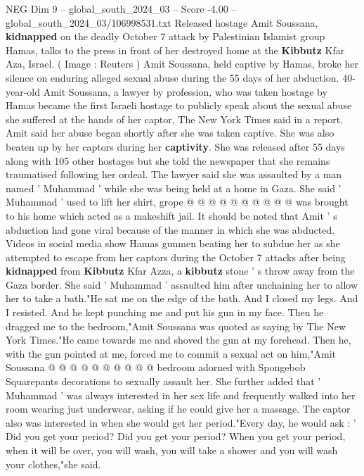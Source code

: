 \begin{textsample}{NEG Dim 9 – global\_south\_2024\_03 – Score -4.00 – global\_south\_2024\_03/106998531.txt}  \label{ex:f9_neg_372}
Released hostage Amit Soussana, \textbf{kidnapped} on the deadly October 7 attack by Palestinian Islamist group Hamas, talks to the press in front of her destroyed home at the \textbf{Kibbutz} Kfar Aza, Israel. ( Image : Reuters ) Amit Soussana, held captive by Hamas, broke her silence on enduring alleged sexual abuse during the 55 days of her abduction. 40-year-old Amit Soussana, a lawyer by profession, who was taken hostage by Hamas became the first Israeli hostage to publicly speak about the sexual abuse she suffered at the hands of her captor, The New York Times said in a report.
Amit said her abuse began shortly after she was taken captive.
She was also beaten up by her captors during her \textbf{captivity}.
She was released after 55 days along with 105 other hostages but she told the newspaper that she remains traumatised following her ordeal.
The lawyer said she was assaulted by a man named ' Muhammad ' while she was being held at a home in Gaza.
She said ' Muhammad ' used to lift her shirt, grope @ @ @ @ @ @ @ @ @ @ was brought to his home which acted as a makeshift jail.
It should be noted that Amit ' s abduction had gone viral because of the manner in which she was abducted.
Videos in social media show Hamas gunmen beating her to subdue her as she attempted to escape from her captors during the October 7 attacks after being \textbf{kidnapped} from \textbf{Kibbutz} Kfar Azza, a \textbf{kibbutz} stone ' s throw away from the Gaza border.
She said ' Muhammad ' assaulted him after unchaining her to allow her to take a bath."He sat me on the edge of the bath.
And I closed my legs.
And I resisted.
And he kept punching me and put his gun in my face.
Then he dragged me to the bedroom,"Amit Soussana was quoted as saying by The New York Times."He came towards me and shoved the gun at my forehead.
Then he, with the gun pointed at me, forced me to commit a sexual act on him,"Amit Soussana @ @ @ @ @ @ @ @ @ @ bedroom adorned with Spongebob Squarepants decorations to sexually assault her.
She further added that ' Muhammad ' was always interested in her sex life and frequently walked into her room wearing just underwear, asking if he could give her a massage.
The captor also was interested in when she would get her period."Every day, he would ask : ' Did you get your period?
Did you get your period?
When you get your period, when it will be over, you will wash, you will take a shower and you will wash your clothes,"she said.

\end{textsample}
